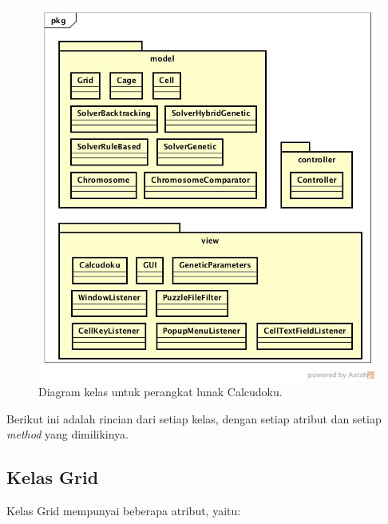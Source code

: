 \begin{figure}
\centering
\captionsetup{justification=centering}
\includegraphics[scale=0.5]{Gambar/Perancangan/DiagramKelas.jpg}
\caption[Diagram kelas untuk perangkat lunak Calcudoku.]{Diagram kelas untuk perangkat lunak Calcudoku.}
\label{fig:diagramkelas}
\end{figure}

Berikut ini adalah rincian dari setiap kelas, dengan setiap atribut dan setiap \textit{method} yang dimilikinya.

\subsection{Kelas Grid}
\label{sec:kelasgrid}

Kelas Grid mempunyai beberapa atribut, yaitu:

